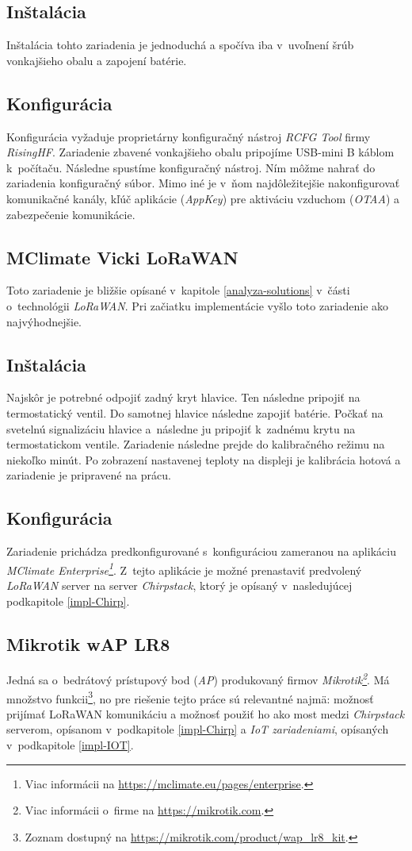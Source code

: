 \subsection*{Inštalácia}
Inštalácia tohto zariadenia je jednoduchá a spočíva iba v~uvoľnení šrúb vonkajšieho obalu a zapojení batérie.
\subsection*{Konfigurácia}
Konfigurácia vyžaduje proprietárny konfiguračný nástroj \emph{RCFG Tool} firmy \emph{RisingHF}. Zariadenie zbavené vonkajšieho obalu pripojíme USB-mini B káblom k~počítaču. Následne spustíme konfiguračný nástroj. Ním môžme nahrať do zariadenia konfiguračný súbor. Mimo iné je v~ňom najdôležitejšie nakonfigurovať komunikačné kanály, kľúč aplikácie (\emph{AppKey}) pre aktiváciu vzduchom (\emph{OTAA}) a zabezpečenie komunikácie. 

\subsection{MClimate Vicki LoRaWAN}\label{impl-Vicki}
Toto zariadenie je bližšie opísané v~kapitole \ref{analyza-solutions} v~části o~technológii \emph{LoRaWAN}. Pri začiatku implementácie vyšlo toto zariadenie ako najvýhodnejšie.
\subsection*{Inštalácia}
Najskôr je potrebné odpojiť zadný kryt hlavice. 
Ten následne pripojiť na termostatický ventil. Do samotnej hlavice následne zapojiť batérie. Počkať na svetelnú signalizáciu hlavice a~následne ju pripojiť k~zadnému  krytu na termostatickom ventile. Zariadenie následne prejde do kalibračného režimu na niekoľko minút. Po zobrazení nastavenej teploty na displeji je kalibrácia hotová a zariadenie je pripravené na prácu.
\subsection*{Konfigurácia}
Zariadenie prichádza predkonfigurované s~konfiguráciou zameranou na aplikáciu \emph{MClimate Enterprise\footnote{Viac informácii na \url{https://mclimate.eu/pages/enterprise}.}}. Z~tejto aplikácie je možné prenastaviť predvolený \emph{LoRaWAN} server na server \emph{Chirpstack}, ktorý je opísaný v~nasledujúcej podkapitole \ref{impl-Chirp}.


\subsection{Mikrotik wAP LR8}
Jedná sa o~bedrátový prístupový bod (\emph{AP}) produkovaný firmov \emph{Mikrotik\footnote{Viac informácii o~firme na \url{https://mikrotik.com}.}}. Má množstvo funkcii\footnote{Zoznam dostupný na \url{https://mikrotik.com/product/wap_lr8_kit}.}, no pre riešenie tejto práce sú relevantné najmä: možnosť prijímať LoRaWAN komunikáciu a možnosť použiť ho ako most medzi \emph{Chirpstack} serverom, opísanom v~podkapitole \ref{impl-Chirp} a \emph{IoT zariadeniami}, opísaných v~podkapitole \ref{impl-IOT}.
